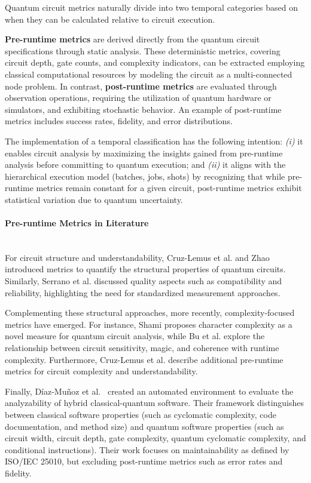 \documentclass{article}
\newcommand{\subsubsubsection}[1]{\paragraph{#1}\mbox{}\\}
\begin{document}
Quantum circuit metrics naturally divide into two temporal categories based on when they can be calculated relative to circuit execution.

\textbf{Pre-runtime metrics} are derived directly from the quantum circuit specifications through static analysis. These deterministic metrics, covering circuit depth, gate counts, and complexity indicators, can be extracted employing classical computational resources by modeling the circuit as a multi-connected node problem. In contrast, \textbf{post-runtime metrics} are evaluated through observation operations, requiring the utilization of quantum hardware or simulators, and exhibiting stochastic behavior. An example of post-runtime metrics includes success rates, fidelity, and error distributions.

The implementation of a temporal classification has the following intention: \emph{(i)} it enables circuit analysis by maximizing the insights gained from pre-runtime analysis before committing to quantum execution; and \emph{(ii)} it aligns with the hierarchical execution model (batches, jobs, shots) by recognizing that while pre-runtime metrics remain constant for a given circuit, post-runtime metrics exhibit statistical variation due to quantum uncertainty.

\subsubsubsection{Pre-runtime Metrics in Literature}

For circuit structure and understandability, Cruz-Lemus et al. \cite{josecruzTowards} and Zhao \cite{Zhao_2021} introduced metrics to quantify the structural properties of quantum circuits. Similarly, Serrano et al. \cite{Serrano2022} discussed quality aspects such as compatibility and reliability, highlighting the need for standardized measurement approaches.

Complementing these structural approaches, more recently, complexity-focused metrics have emerged. For instance, Shami \cite{shamiCharacterComplexityNovel_2024} proposes character complexity as a novel measure for quantum circuit analysis, while Bu et al. \cite{buComplexityQuantumCircuits_2024} explore the relationship between circuit sensitivity, magic, and coherence with runtime complexity. Furthermore, Cruz-Lemus et al. \cite{cruz-lemusQuantumSoftwareQuality_2024} describe additional pre-runtime metrics for circuit complexity and understandability.

Finally, Díaz-Muñoz et al.~\cite{diazMunozEnvironmentEvaluation_2025} created an automated environment to evaluate the analyzability of hybrid classical-quantum software. Their framework distinguishes between classical software properties (such as cyclomatic complexity, code documentation, and method size) and quantum software properties (such as circuit width, circuit depth, gate complexity, quantum cyclomatic complexity, and conditional instructions). Their work focuses on maintainability as defined by ISO/IEC 25010, but excluding post-runtime metrics such as error rates and fidelity.
\end{document}
